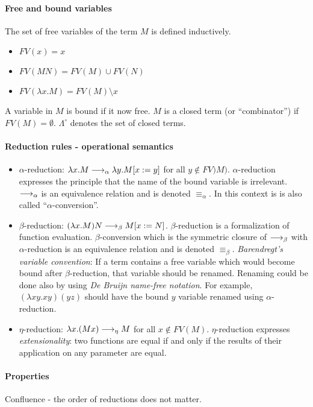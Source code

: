 \paragraph{Free and bound variables}

The set of free variables of the \lc term $M$ is defined inductively.
\begin{itemize}
	\item $FV(x) = {x}$
	\item $FV(MN) = FV(M)\cup FV(N)$
	\item $FV(\lambda x. M) = FV(M) \setminus {x}$
\end{itemize}
A variable in $M$ is bound if it now free. $M$ is a closed \lc term (or ``combinator'') if $FV(M) = \emptyset$. $\Lambda^\circ$ denotes 
the set of closed \lc terms.

\paragraph{Reduction rules - operational semantics}
\begin{itemize}
	\item $\alpha$-reduction: $\lambda x. M \longrightarrow_\alpha \lambda y. M[x := y]$ for all $y\notin FV)M)$. $\alpha$-reduction expresses
	the principle that the name of the bound variable is irrelevant. 
	$\longrightarrow_\alpha$ is an equivalence relation and is denoted $\equiv_\alpha$.
	In this context is is also called ``$\alpha$-conversion''.
	\item $\beta$-reduction: $(\lambda x. M) N \longrightarrow_\beta M[x := N]$. $\beta$-reduction is a formalization of function evaluation.
	$\beta$-conversion which is the symmetric closure of $\longrightarrow_\beta$ with $\alpha$-reduction is an equivalence relation  and
	is denoted $\equiv_\beta$.
	\emph{Barendregt's variable convention}: If a term contains a free variable which would become bound after $\beta$-reduction,
	that variable should be renamed. Renaming could be done also by using \emph{De Bruijn name-free notation}.
	For example, $(\lambda xy. xy)(yz)$ should have the bound $y$ variable renamed using $\alpha$-reduction.
	\item $\eta$-reduction: $\lambda x. (M x) \longrightarrow_\eta M$ for all $x\notin FV(M)$. $\eta$-reduction
	expresses \emph{extensionality}: two functions are equal if and only if the results of their application on any parameter are equal.
\end{itemize} 

\paragraph{Properties}
Confluence - the order of reductions does not matter.

